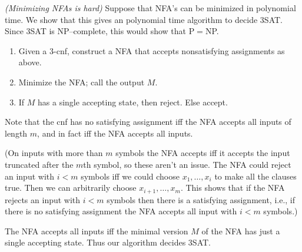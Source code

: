 \begin{problem}{\it(Minimizing NFAs is hard)}
Suppose that NFA's can be minimized in polynomial time. We show that this gives an polynomial time algorithm to decide 3SAT. Since 3SAT is NP--complete, this would show that P$=$NP.
\begin{enumerate}
\item Given a 3-cnf, construct a NFA that accepts nonsatisfying assignments as above. 
\item Minimize the NFA; call the output $M$.
\item If $M$ has a single accepting state, then reject. Else accept.
\end{enumerate}
Note that the cnf has no satisfying assignment iff the NFA accepts all inputs of length $m$, and in fact iff the NFA accepts all inputs.

(On inputs with more than $m$ symbols the NFA accepts iff it accepts the input truncated after the $m$th symbol, so these aren't an issue. The NFA could reject an input with $i<m$ symbols iff we could choose $x_1,\ldots, x_i$ to make all the clauses true. Then we can arbitrarily choose $x_{i+1},\ldots, x_m$. This shows that if the NFA rejects an input with $i<m$ symbols then there is a satisfying assignment, i.e., if there is no satisfying assignment the NFA accepts all input with $i<m$ symbols.)

The NFA accepts all inputs iff the minimal version $M$ of the NFA has just a single accepting state. Thus our algorithm decides 3SAT.
\end{problem}

\pagebreak

